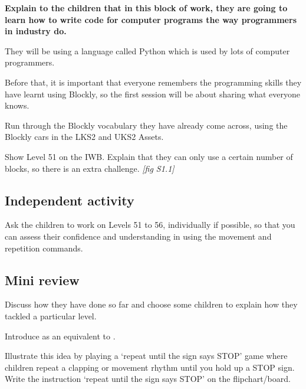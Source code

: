 \documentclass{../../../lessonplan}
\begin{document}
\begin{lessonplan}

\textbf{Explain to the children that in this block of work, they are going to learn how to write code for computer programs the way programmers in industry do.}

They will be using a language called Python which is used by lots of computer programmers.

Before that, it is important that everyone remembers the programming skills they have learnt using Blockly, so the first session will be about sharing what everyone knows.

Run through the Blockly vocabulary they have already come across, using the Blockly cars in the LKS2 and UKS2 Assets.


Show Level 51 on the IWB.
Explain that they can only use a certain number of blocks, so there is an extra challenge. \textit{[fig S1.1]}


\subsection*{Independent activity}

Ask the children to work on Levels 51 to 56, individually if possible, so that you can assess their confidence and understanding in using the movement and repetition commands.

\subsection*{Mini review}

Discuss how they have done so far and choose some children to explain how they tackled a particular level.


Introduce  as an equivalent to .


Illustrate this idea by playing a `repeat until the sign says STOP' game where children repeat a clapping or movement rhythm until you hold up a STOP sign.
Write the instruction `repeat until the sign says STOP' on the flipchart/board.


\end{lessonplan}
\end{document}
